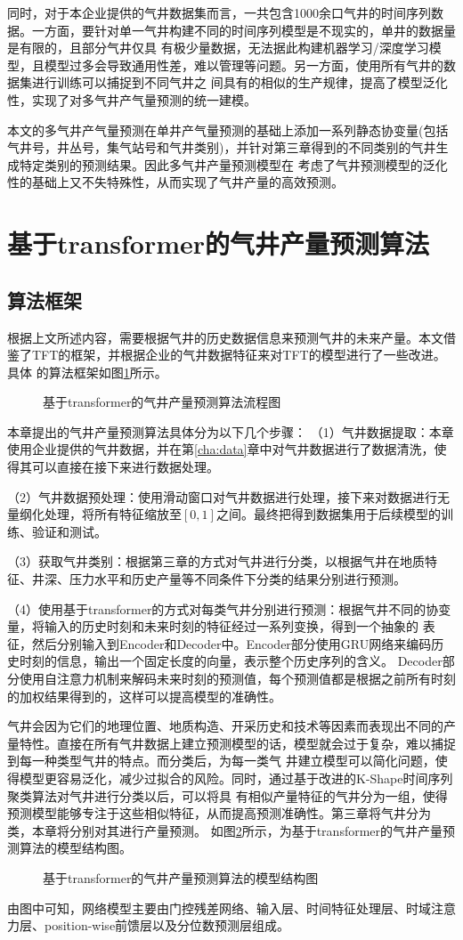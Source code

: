 同时，对于本企业提供的气井数据集而言，一共包含1000余口气井的时间序列数据。一方面，要针对单一气井构建不同的时间序列模型是不现实的，单井的数据量是有限的，且部分气井仅具
有极少量数据，无法据此构建机器学习/深度学习模型，且模型过多会导致通用性差，难以管理等问题。另一方面，使用所有气井的数据集进行训练可以捕捉到不同气井之
间具有的相似的生产规律，提高了模型泛化性，实现了对多气井产气量预测的统一建模。

本文的多气井产气量预测在单井产气量预测的基础上添加一系列静态协变量(包括气井号，井丛号，集气站号和气井类别)，并针对第三章得到的不同类别的气井生成特定类别的预测结果。因此多气井产量预测模型在
考虑了气井预测模型的泛化性的基础上又不失特殊性，从而实现了气井产量的高效预测。
\section{基于transformer的气井产量预测算法}
\subsection{算法框架}
根据上文所述内容，需要根据气井的历史数据信息来预测气井的未来产量。本文借鉴了TFT的框架，并根据企业的气井数据特征来对TFT的模型进行了一些改进。具体
的算法框架如图\ref{fig:TFTprogess}所示。
\begin{figure}[H]
    \label{fig:TFTprogess}
    \caption{基于transformer的气井产量预测算法流程图}
\end{figure}
本章提出的气井产量预测算法具体分为以下几个步骤：
（1）气井数据提取：本章使用企业提供的气井数据，并在第\ref{cha:data}章中对气井数据进行了数据清洗，使得其可以直接在接下来进行数据处理。

（2）气井数据预处理：使用滑动窗口对气井数据进行处理，接下来对数据进行无量纲化处理，将所有特征缩放至$[0,1]$之间。最终把得到数据集用于后续模型的训练、验证和测试。

（3）获取气井类别：根据第三章的方式对气井进行分类，以根据气井在地质特征、井深、压力水平和历史产量等不同条件下分类的结果分别进行预测。

（4）使用基于transformer的方式对每类气井分别进行预测：根据气井不同的协变量，将输入的历史时刻和未来时刻的特征经过一系列变换，得到一个抽象的
表征，然后分别输入到Encoder和Decoder中。Encoder部分使用GRU网络来编码历史时刻的信息，输出一个固定长度的向量，表示整个历史序列的含义。
Decoder部分使用自注意力机制来解码未来时刻的预测值，每个预测值都是根据之前所有时刻的加权结果得到的，这样可以提高模型的准确性。

气井会因为它们的地理位置、地质构造、开采历史和技术等因素而表现出不同的产量特性。直接在所有气井数据上建立预测模型的话，模型就会过于复杂，难以捕捉到每一种类型气井的特点。而分类后，为每一类气
井建立模型可以简化问题，使得模型更容易泛化，减少过拟合的风险。同时，通过基于改进的K-Shape时间序列聚类算法对气井进行分类以后，可以将具
有相似产量特征的气井分为一组，使得预测模型能够专注于这些相似特征，从而提高预测准确性。第三章将气井分为 类，本章将分别对其进行产量预测。
如图\ref{fig:TFT}所示，为基于transformer的气井产量预测算法的模型结构图。
\begin{figure}
    \label{fig:TFT}
    \caption{基于transformer的气井产量预测算法的模型结构图}
\end{figure}
由图中可知，网络模型主要由门控残差网络、输入层、时间特征处理层、时域注意力层、position-wise前馈层以及分位数预测层组成。
